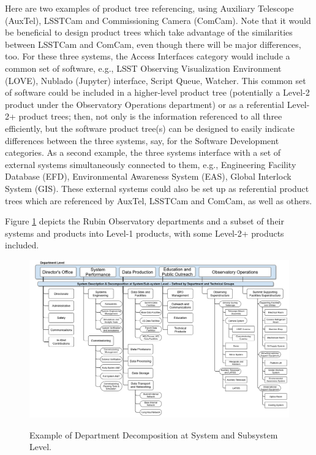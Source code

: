 Here are two examples of product tree referencing, using Auxiliary Telescope (AuxTel), LSSTCam and Commissioning Camera (ComCam).
Note that it would be beneficial to design product trees which take advantage of the similarities between LSSTCam and ComCam, even though there will be major differences, too.
For these three systems, the Access Interfaces category would include a common set of software, e.g., LSST Observing Visualization Environment (LOVE), Nublado (Jupyter) interface, Script Queue, Watcher.
This common set of software could be included in a higher-level product tree (potentially a Level-2 product under the Observatory Operations department) or as a referential Level-2+ product trees; then, not only is the information referenced to all three efficiently, but the software product tree(s) can be designed to easily indicate differences between the three systems, say, for the Software Development categories.
As a second example, the three systems interface with a set of external systems simultaneously connected to them, e.g., Engineering Facility Database (EFD), Environmental Awareness System (EAS), Global Interlock System (GIS).
These external systems could also be set up as referential product trees which are referenced by AuxTel, LSSTCam and ComCam, as well as others.

Figure \ref{fig:product-view-departments} depicts the Rubin Observatory departments and a subset of their systems and products into Level-1 products, with some Level-2+ products included.

\begin{figure}[t]
\caption{Example of Department Decomposition at System and Subsystem Level.}
\centering
\includegraphics[width=\textwidth]{product-view-departments-decomposition}
\label{fig:product-view-departments}
\end{figure}

